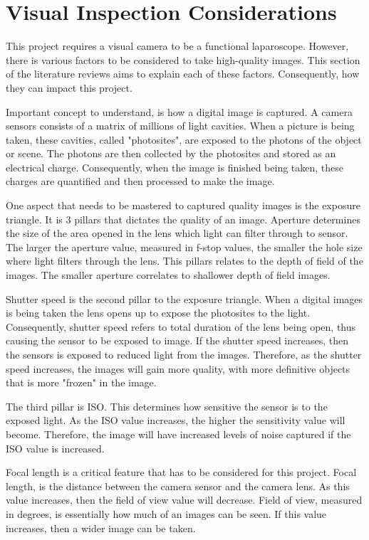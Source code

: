 \section{Visual Inspection Considerations}
\label{sec:Visual Inspection Considerations}

This project requires a visual camera to be a functional laparoscope. However, there is various factors to be considered to take high-quality images. This section of the literature reviews aims to explain each of these factors. Consequently, how they can impact this project.

\vspace{0.5cm}
\noindent Important concept to understand, is how a digital image is captured. A camera sensors consists of a matrix of millions of light cavities. When a picture is being taken, these cavities, called "photosites", are exposed to the photons of the object or scene. The photons are then collected by the photosites and stored as an electrical charge. Consequently, when the image is finished being taken, these charges are quantified and then processed to make the image. \citep{CC-DCS}

\vspace{0.5cm}
\noindent One aspect that needs to be mastered to captured quality images is the exposure triangle. It is 3 pillars that dictates the quality of an image. Aperture determines the size of the area opened in the lens which light can filter through to sensor. The larger the aperture value, measured in f-stop values, the smaller the hole size where light filters through the lens. This pillars relates to the depth of field of the images. The smaller aperture correlates to shallower depth of field images. \citep{CC-CE}

\vspace{0.5cm}
\noindent Shutter speed is the second pillar to the exposure triangle. When a digital images is being taken the lens opens up to expose the photosites to the light. Consequently, shutter speed refers to total duration of the lens being open, thus causing the sensor to be exposed to image. If the shutter speed increases, then the sensors is exposed to reduced light from the images. Therefore, as the shutter speed increases, the images will gain more quality, with more definitive objects that is more "frozen" in the image. \citep{CC-CE}

\vspace{0.5cm}
\noindent The third pillar is ISO. This determines how sensitive the sensor is to the exposed light. As the ISO value increases, the higher the sensitivity value will become. Therefore, the image will have increased levels of noise captured if the ISO value is increased. \citep{CC-CE}

\vspace{0.5cm}
\noindent Focal length is a critical feature that has to be considered for this project. Focal length, is the distance between the camera sensor and the camera lens. As this value increases, then the field of view value will decrease. Field of view, measured in degrees, is essentially how much of an images can be seen. If this value increases, then a wider image can be taken. \citep{DM-FOW}






